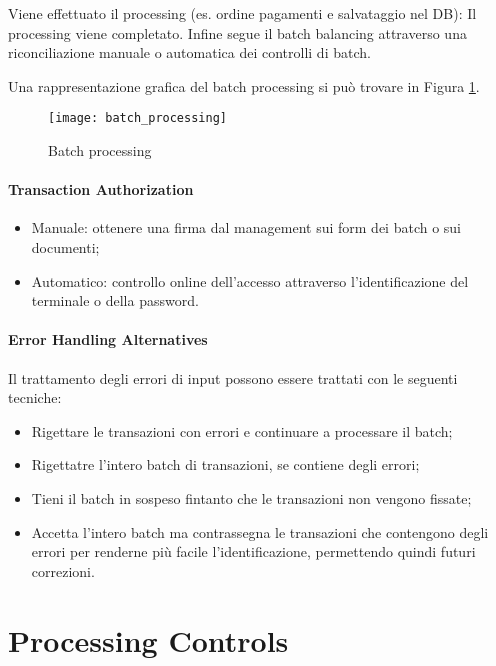 Viene effettuato il processing (es. ordine pagamenti e salvataggio nel DB):
Il processing viene completato.
Infine segue il batch balancing attraverso 
una riconciliazione manuale o automatica dei controlli di batch.

Una rappresentazione grafica del batch processing si può trovare in 
Figura \ref{fig:security:batch:processing}.
\begin{figure}[h!]
        \begin{center}
                \texttt{[image: batch\_processing]}
        \end{center}
        \caption{Batch processing}
        \label{fig:security:batch:processing}
\end{figure}

\paragraph{Transaction Authorization}
\begin{itemize}
	\item Manuale: ottenere una firma dal management sui form dei batch o sui
	documenti;
	\item Automatico: controllo online dell'accesso attraverso l'identificazione del
	terminale o della password.
\end{itemize}

\paragraph{Error Handling Alternatives}
Il trattamento degli errori di input possono essere trattati
con le seguenti tecniche:
\begin{itemize}
\item Rigettare le transazioni con errori e continuare a processare 
il batch;
\item Rigettatre l'intero batch di transazioni, se contiene
degli errori;
\item Tieni il batch in sospeso fintanto che le transazioni 
non vengono fissate;
\item Accetta l'intero batch ma contrassegna le transazioni che
contengono degli errori per renderne più facile l'identificazione,
permettendo quindi futuri correzioni.
\end{itemize}






\section{Processing Controls}

